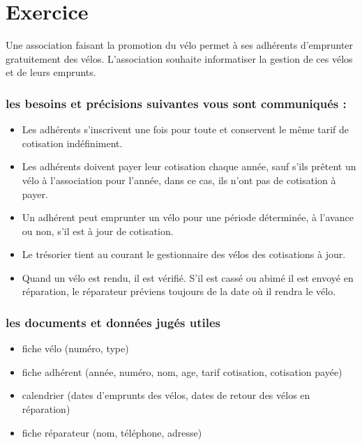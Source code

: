 \section*{Exercice}
Une association faisant la promotion du vélo permet à ses adhérents d'emprunter gratuitement des vélos.
L'association souhaite informatiser la gestion de ces vélos et de leurs emprunts.

\subsubsection*{les besoins et précisions suivantes vous sont communiqués :}
\begin{itemize}
    \item Les adhérents s’inscrivent une fois pour toute et conservent le même tarif de cotisation indéfiniment.
    \item Les adhérents doivent payer leur cotisation chaque année, sauf s'ils prêtent un vélo à l'association pour l'année, dans ce cas, ils n'ont pas de cotisation à payer.
    \item Un adhérent peut emprunter un vélo pour une période déterminée, à l'avance ou non, s'il est à jour de cotisation.
    \item Le trésorier tient au courant le gestionnaire des vélos des cotisations à jour.
    \item Quand un vélo est rendu, il est vérifié. S'il est cassé ou abimé il est envoyé en réparation, le réparateur préviens toujours de la date où il rendra le vélo.
\end{itemize}

\subsubsection*{les documents et données jugés utiles}
\begin{itemize}
    \item fiche vélo (numéro, type)
    \item fiche adhérent (année, numéro, nom, age, tarif cotisation, cotisation payée)
    \item calendrier (dates d'emprunts des vélos, dates de retour des vélos en réparation)
    \item fiche réparateur (nom, téléphone, adresse)
\end{itemize}

